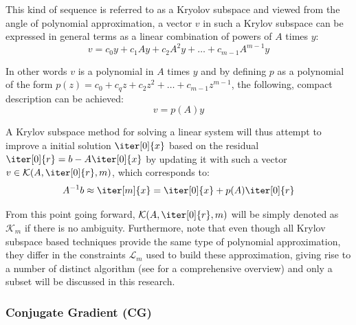 \noindent This kind of sequence is referred to as a Kryolov subspace and viewed from the angle of polynomial approximation, a vector $v$ in such a Krylov subspace can be expressed in general terms as a linear combination of powers of $A$ times $y$:
\begin{equation}
\label{eqn:poly1}
    v = c_0y+c_1Ay+c_2A^2y+\dots+c_{m-1}A^{m-1}y
\end{equation}

\noindent In other words $v$ is a polynomial in $A$ times $y$ and by defining $p$ as a polynomial of the form $p(z) = c_0+c_qz+c_2z^2+\dots+c_{m-1}z^{m-1}$, the following, compact description can be achieved:
\begin{equation}
\label{eqn:poly2}
v=p(A)y  
\end{equation}

\noindent A Krylov subspace method for solving a linear system will thus attempt to improve a initial solution $\iter[0]{x}$ based on the residual $\iter[0]{r} = b-A\iter[0]{x}$ by updating it with such a vector $v \in \mathcal{K}(A, \iter[0]{r},m)$, which corresponds to:
\begin{equation}
    A^{-1}b \approx \iter[m]{x} = \iter[0]{x}+p(A)\iter[0]{r}
\end{equation}

\noindent From this point going forward, $\mathcal{K}(A, \iter[0]{r},m)$ will be simply denoted as $\mathcal{K}_m$ if there is no ambiguity. Furthermore, note that even though all Krylov subspace based techniques provide the same type of polynomial approximation, they differ in the constraints $\mathcal{L}_m$ used to build these approximation, giving rise to a number of distinct algorithm (see \cite{saad_iterative_2003} for a comprehensive overview) and only a subset will be discussed in this research.



\subsubsection{Conjugate Gradient (CG)}
\label{sec:conjugate_gradient}

